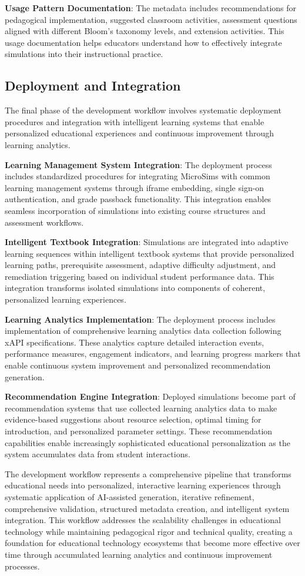 \textbf{Usage Pattern Documentation}: The metadata includes recommendations for pedagogical implementation, suggested classroom activities, assessment questions aligned with different Bloom's taxonomy levels, and extension activities. This usage documentation helps educators understand how to effectively integrate simulations into their instructional practice.

\subsection{Deployment and Integration}

The final phase of the development workflow involves systematic deployment procedures and integration with intelligent learning systems that enable personalized educational experiences and continuous improvement through learning analytics.

\textbf{Learning Management System Integration}: The deployment process includes standardized procedures for integrating MicroSims with common learning management systems through iframe embedding, single sign-on authentication, and grade passback functionality. This integration enables seamless incorporation of simulations into existing course structures and assessment workflows.

\textbf{Intelligent Textbook Integration}: Simulations are integrated into adaptive learning sequences within intelligent textbook systems that provide personalized learning paths, prerequisite assessment, adaptive difficulty adjustment, and remediation triggering based on individual student performance data. This integration transforms isolated simulations into components of coherent, personalized learning experiences.

\textbf{Learning Analytics Implementation}: The deployment process includes implementation of comprehensive learning analytics data collection following xAPI specifications. These analytics capture detailed interaction events, performance measures, engagement indicators, and learning progress markers that enable continuous system improvement and personalized recommendation generation.

\textbf{Recommendation Engine Integration}: Deployed simulations become part of recommendation systems that use collected learning analytics data to make evidence-based suggestions about resource selection, optimal timing for introduction, and personalized parameter settings. These recommendation capabilities enable increasingly sophisticated educational personalization as the system accumulates data from student interactions.

The development workflow represents a comprehensive pipeline that transforms educational needs into personalized, interactive learning experiences through systematic application of AI-assisted generation, iterative refinement, comprehensive validation, structured metadata creation, and intelligent system integration. This workflow addresses the scalability challenges in educational technology while maintaining pedagogical rigor and technical quality, creating a foundation for educational technology ecosystems that become more effective over time through accumulated learning analytics and continuous improvement processes.
